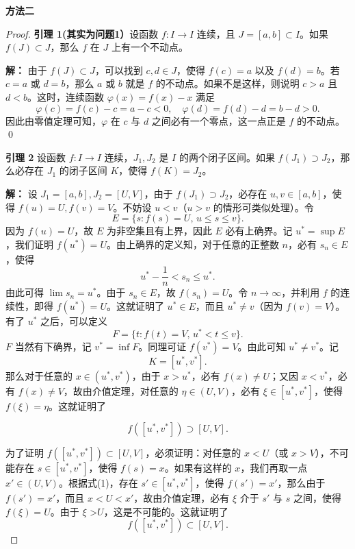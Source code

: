 \documentclass[12pt]{ctexart}
\begin{document}
\textbf{方法二}
\begin{proof}

\textbf{引理 1(其实为问题1）}设函数 $f: I \to I$ 连续，且 $J = [a, b] \subset I$。如果 $f(J) \subset J$，那么 $f$ 在 $J$ 上有一个不动点。

\textbf{解：} 由于 $f(J) \subset J$，可以找到 $c, d \in J$，使得 $f(c) = a$ 以及 $f(d) = b$。若 $c = a$ 或 $d = b$，那么 $a$ 或 $b$ 就是 $f$ 的不动点。如果不是这样，则说明 $c > a$ 且 $d < b$。这时，连续函数 $\varphi(x) = f(x) - x$ 满足
\[
\varphi(c) = f(c) - c = a - c < 0, \quad \varphi(d) = f(d) - d = b - d > 0.
\]
因此由零值定理可知，$\varphi$ 在 $c$ 与 $d$ 之间必有一个零点，这一点正是 $f$ 的不动点。
\qed

\textbf{引理 2} 设函数 $f: I \to I$ 连续，$J_1, J_2$ 是 $I$ 的两个闭子区间。如果 $f(J_1) \supset J_2$，那么必存在 $J_1$ 的闭子区间 $K$，使得 $f(K) = J_2$。

\textbf{解：} 设 $J_1 = [a, b], J_2 = [U, V]$，由于 $f(J_1) \supset J_2$，必存在 $u, v \in [a, b]$，使得 $f(u) = U, f(v) = V$。不妨设 $u < v$（$u > v$ 的情形可类似处理）。令
\[
E = \{s : f(s) = U, \, u \leq s \leq v \}.
\]
因为 $f(u) = U$，故 $E$ 为非空集且有上界，因此 $E$ 必有上确界。记 $u^* = \sup E$，我们证明 $f(u^*) = U$。由上确界的定义知，对于任意的正整数 $n$，必有 $s_n \in E$，使得
\[
u^* - \frac{1}{n} < s_n \leq u^*.
\]
由此可得 $\lim s_n = u^*$。由于 $s_n \in E$，故 $f(s_n) = U$。令 $n \to \infty$，并利用 $f$ 的连续性，即得 $f(u^*) = U$。这就证明了 $u^* \in E$，而且 $u^* \neq v$（因为 $f(v) = V$）。有了 $u^*$ 之后，可以定义
\[
F = \{t : f(t) = V, \, u^* < t \leq v\}.
\]
$F$ 当然有下确界，记 $v^* = \inf F$。同理可证 $f(v^*) = V$。由此可知 $u^* \neq v^*$。记
\[
K = [u^*, v^*].
\]
那么对于任意的 $x \in (u^*, v^*)$，由于 $x > u^*$，必有 $f(x) \neq U$；又因 $x < v^*$，必有 $f(x) \neq V$，故由介值定理，对任意的 $\eta \in (U, V)$，必有 $\xi \in [u^*, v^*]$，使得 $f(\xi) = \eta$。这就证明了

\begin{equation}
f([u^*, v^*]) \supset [U, V]. \tag{1}
\end{equation}

为了证明 $f([u^*, v^*]) \subset [U, V]$，必须证明：对任意的 $x < U$（或 $x > V$），不可能存在 $s \in [u^*, v^*]$，使得 $f(s) = x$。如果有这样的 $x$，我们再取一点 $x' \in (U, V)$。根据式(1)，存在 $s' \in [u^*, v^*]$，使得 $f(s') = x'$，那么由于 $f(s') = x'$，而且 $x < U < x'$，故由介值定理，必有 $\xi$ 介于 $s'$ 与 $s$ 之间，使得 $f(\xi) = U$。由于 $\xi$ >$ U$，这是不可能的。这就证明了
\begin{equation}
f([u^*, v^*]) \subset [U, V]. \tag{2}
\end{equation}


\end{proof}
\end{document}
